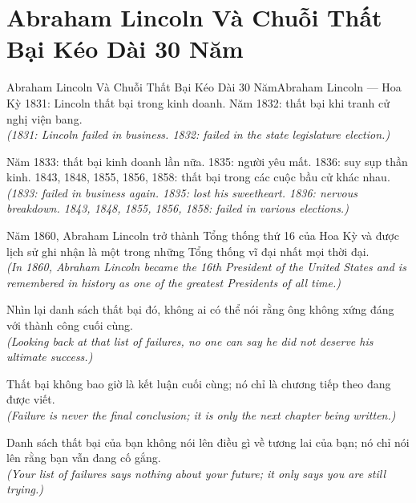 \section{Abraham Lincoln Và Chuỗi Thất Bại Kéo Dài 30 Năm}
\begin{truyen}{Abraham Lincoln Và Chuỗi Thất Bại Kéo Dài 30 Năm}{Abraham Lincoln --- Hoa Kỳ}
 1831: Lincoln thất bại trong kinh doanh. Năm 1832: thất bại khi tranh cử nghị viện bang.\\[4pt]
\textit{(1831: Lincoln failed in business. 1832: failed in the state legislature election.)}

Năm 1833: thất bại kinh doanh lần nữa. 1835: người yêu mất. 1836: suy sụp thần kinh. 1843, 1848, 1855, 1856, 1858: thất bại trong các cuộc bầu cử khác nhau.\\[4pt]
\textit{(1833: failed in business again. 1835: lost his sweetheart. 1836: nervous breakdown. 1843, 1848, 1855, 1856, 1858: failed in various elections.)}

Năm 1860, Abraham Lincoln trở thành Tổng thống thứ 16 của Hoa Kỳ và được lịch sử ghi nhận là một trong những Tổng thống vĩ đại nhất mọi thời đại.\\[4pt]
\textit{(In 1860, Abraham Lincoln became the 16th President of the United States and is remembered in history as one of the greatest Presidents of all time.)}

Nhìn lại danh sách thất bại đó, không ai có thể nói rằng ông không xứng đáng với thành công cuối cùng.\\[4pt]
\textit{(Looking back at that list of failures, no one can say he did not deserve his ultimate success.)}

Thất bại không bao giờ là kết luận cuối cùng; nó chỉ là chương tiếp theo đang được viết.\\[4pt]
\textit{(Failure is never the final conclusion; it is only the next chapter being written.)}

\end{truyen}
\begin{baihoc}
  Danh sách thất bại của bạn không nói lên điều gì về tương lai của bạn; nó chỉ nói lên rằng bạn vẫn đang cố gắng.\\[4pt]
  \textit{(Your list of failures says nothing about your future; it only says you are still trying.)}
\end{baihoc}

